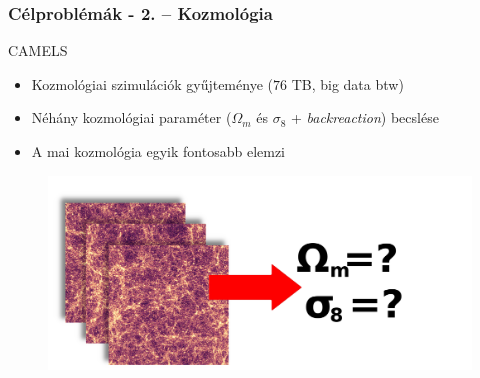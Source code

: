 \begin{frame}
\frametitle{Célproblémák - 2. -- Kozmológia}

\begin{block}{CAMELS}
	\begin{itemize}
		\item Kozmológiai szimulációk gyűjteménye ($76$ TB, big data btw)
		\item Néhány kozmológiai paraméter ($\Omega_{m}$ és $\sigma_{8}$ + \textit{backreaction}) becslése
		\item A mai kozmológia egyik fontosabb  elemzi
	\end{itemize}
\end{block}

\begin{figure}
	\includegraphics[width=1.0\textwidth]{img/probs2-camels.png}
\end{figure}

\end{frame}